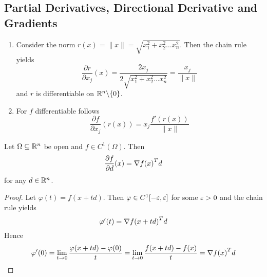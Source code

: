 \subsection{Partial Derivatives, Directional Derivative and Gradients}
\bigskip

\begin{examples}\hfill
    \begin{enumerate}
        \item Consider the norm \( r(x) = \|x\| = \sqrt{x_1^2 + x_2^2 \dots x_n^2} \). Then the chain rule yields
              \[
                  \frac{\partial r}{\partial x_j}(x) = \frac{2 x_j}{2 \sqrt{x_1^2 + x_2^2 \dots x_n^2}}
                  = \frac{x_j}{\|x\|}
              \]
              and \( r \) is differentiable on \( \mathbb{R}^n {\setminus} \{ 0 \} \).
        \item For \( f \) differentiable follows
              \[
                  \frac{\partial f}{\partial x_j}(r(x)) = x_j \frac{f'(r(x))}{\|x\|}
              \]
    \end{enumerate}
\end{examples}


\begin{lemma}\label{lemma:directional_derivative}
    Let \( \Omega \subseteq \mathbb{R}^n \) be open and \( f \in C^1(\Omega) \). Then
    \[
        \frac{\partial f}{\partial d}(x) = \nabla{f(x)}^T d
    \]
    for any \( d \in \mathbb{R}^n \).
\end{lemma}

\begin{proof}
    Let \( \varphi(t) = f(x + td) \). Then \( \varphi \in C^1[-\varepsilon, \varepsilon ] \) for some \( \varepsilon > 0 \)
    and the chain rule yields
    \[
        \varphi'(t) = {\nabla f(x + td)}^T d
    \]
    Hence
    \[
        \varphi'(0) = \lim_{t \to 0} \frac{\varphi(x + td) - \varphi(0)}{t} =
        \lim_{t \to 0} \frac{f(x + td) - f(x)}{t} = {\nabla f(x)}^T d
    \]
\end{proof}
\bigskip


